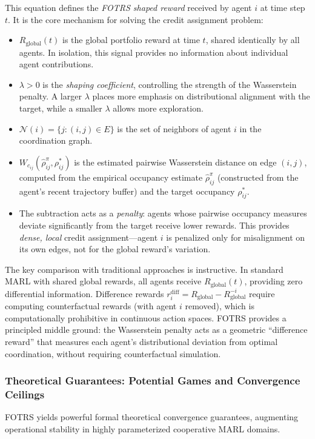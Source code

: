\documentclass[12pt,a4paper,oneside]{report}
\theoremstyle{definition}
\theoremstyle{remark}
\begin{document}
\medskip
\noindent This equation defines the \emph{FOTRS shaped reward} received by agent $i$ at time step $t$. It is the core mechanism for solving the credit assignment problem:
\begin{itemize}[leftmargin=2em]
  \item $R_{\text{global}}(t)$ is the global portfolio reward at time $t$, shared identically by all agents. In isolation, this signal provides no information about individual agent contributions.
  \item $\lambda > 0$ is the \emph{shaping coefficient}, controlling the strength of the Wasserstein penalty. A larger $\lambda$ places more emphasis on distributional alignment with the target, while a smaller $\lambda$ allows more exploration.
  \item $\mathcal{N}(i) = \{j : (i,j) \in E\}$ is the set of neighbors of agent $i$ in the coordination graph.
  \item $W_{c_{ij}}(\hat{\rho}^\pi_{ij}, \rho^*_{ij})$ is the estimated pairwise Wasserstein distance on edge $(i,j)$, computed from the empirical occupancy estimate $\hat{\rho}^\pi_{ij}$ (constructed from the agent's recent trajectory buffer) and the target occupancy $\rho^*_{ij}$.
  \item The subtraction acts as a \emph{penalty}: agents whose pairwise occupancy measures deviate significantly from the target receive lower rewards. This provides \emph{dense, local} credit assignment---agent $i$ is penalized only for misalignment on its own edges, not for the global reward's variation.
\end{itemize}

\noindent The key comparison with traditional approaches is instructive. In standard MARL with shared global rewards, all agents receive $R_{\text{global}}(t)$, providing zero differential information. Difference rewards $r_i^{\text{diff}} = R_{\text{global}} - R_{\text{global}}^{-i}$ require computing counterfactual rewards (with agent $i$ removed), which is computationally prohibitive in continuous action spaces. FOTRS provides a principled middle ground: the Wasserstein penalty acts as a geometric ``difference reward'' that measures each agent's distributional deviation from optimal coordination, without requiring counterfactual simulation.

\subsubsection{Theoretical Guarantees: Potential Games and Convergence Ceilings}
FOTRS yields powerful formal theoretical convergence guarantees, augmenting operational stability in highly parameterized cooperative MARL domains.
\end{document}

